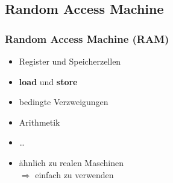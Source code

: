 \subsection{Random Access Machine}
\begin{frame}
    \frametitle{Random Access Machine (RAM)}
    \begin{itemize}
        \item Register und Speicherzellen
        \item \textbf{load} und \textbf{store}
        \item bedingte Verzweigungen
        \item Arithmetik
        \item \ldots
        \item ähnlich zu realen Maschinen \\
            $\Rightarrow$ einfach zu verwenden
    \end{itemize}
\end{frame}
